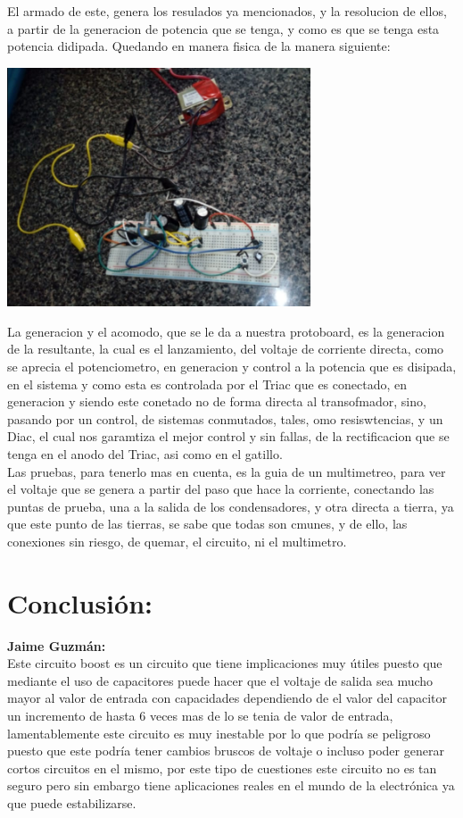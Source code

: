 \documentclass[12pt,a4paper]{article}
\begin{document}
El armado de este, genera los resulados ya mencionados, y la resolucion de ellos, a partir de la generacion de potencia que se tenga, y como es que se tenga esta potencia didipada. Quedando en manera fisica de la manera siguiente:

\begin{center}
\includegraphics[width=9cm]{Fisico.jpeg} 
\end{center}

La generacion y el acomodo, que se le da a nuestra protoboard, es la generacion de la resultante, la cual es el lanzamiento, del voltaje de corriente directa, como se aprecia el potenciometro, en generacion y control a la potencia que es disipada, en el sistema y como esta es controlada por el Triac que es conectado, en generacion y siendo este conetado no de forma directa al transofmador, sino, pasando por un control, de sistemas conmutados, tales, omo resiswtencias, y un Diac, el cual nos garamtiza el mejor control y sin fallas, de la rectificacion que se tenga en el anodo del Triac, asi como en el gatillo.\\

Las pruebas, para tenerlo mas en cuenta, es la guia de un multimetreo, para ver el voltaje que se genera a partir del paso que hace la corriente, conectando las puntas de prueba, una a la salida de los condensadores, y otra directa a tierra, ya que este punto de las tierras, se sabe que todas son cmunes, y de ello, las conexiones sin riesgo, de quemar, el circuito, ni el multimetro.

\section{Conclusión:}

\textbf{Jaime Guzmán:}\\
Este circuito boost es un circuito que tiene implicaciones muy útiles puesto que mediante el uso de capacitores puede hacer que el voltaje de salida sea mucho mayor al valor de entrada con capacidades dependiendo de el valor del capacitor un incremento de hasta 6 veces mas de lo se tenia de valor de entrada, lamentablemente este circuito es muy inestable por lo que podría se peligroso puesto que este podría tener cambios bruscos de voltaje o incluso poder generar cortos circuitos en el mismo, por este tipo de cuestiones este circuito no es tan seguro pero sin embargo tiene aplicaciones reales en el mundo de la electrónica ya que puede estabilizarse.\\
\end{document}

